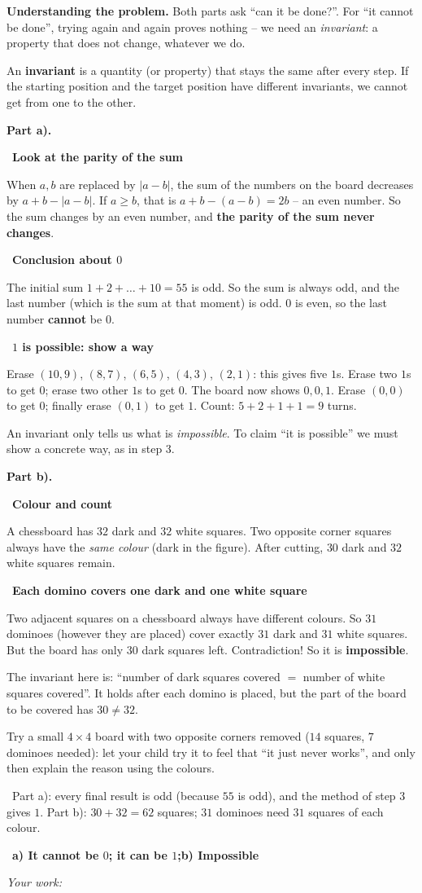 \documentclass[11pt]{article}
\newif\ifsol \solfalse
\providecommand{\AnsWord}{Đáp số}
\newcommand{\StuProb}[2]{\begin{probboxS}{#1}{#2}\StuProbBody\end{probboxS}}
\newcommand{\ans}[1]{\par\smallskip{\bfseries\color{tmGreen!88!black}\AnsWord:}\ {\bfseries\color{AnsRed}#1}\par}
\newcommand{\probsol}[1]{%
  \begin{lrbox}{\solmeasure}\begin{minipage}{\dimexpr\linewidth-24pt\relax}#1\end{minipage}\end{lrbox}%
  \ifsol
    \begin{solbox}#1\end{solbox}%
  \else
    \setlength{\solht}{\dimexpr\ht\solmeasure+\dp\solmeasure+0.85cm\relax}%
    \ifdim\solht<1.35cm\setlength{\solht}{1.35cm}\fi
    \ifdim\solht>\StudentMaxWork\setlength{\solht}{\StudentMaxWork}\fi
    \par\noindent\begin{minipage}{\linewidth}%
    \expandafter\StuProb\StuProbArgs
    \begin{tcolorbox}[colback=white,colframe=Line,boxrule=0.8pt,arc=5pt,
      left=8pt,right=8pt,top=4pt,bottom=4pt,height=\solht]{\footnotesize\color{Slate}\itshape\WorkWord}\end{tcolorbox}%
    \end{minipage}\par\medskip
  \fi}
\newlength{\StudentMaxWork}\setlength{\StudentMaxWork}{4.5cm}
\newcommand{\step}[2]{\par\smallskip\noindent{\bfseries\color{tmBlue!85!black}\StepWord~#1.}\ {\bfseries #2}\par\nopagebreak}
\newcommand{\verify}[1]{\par\smallskip\noindent{\bfseries\color{tmGreen!80!black}\faCheckCircle\ \CheckWord}\ #1\par}
\def\WorkWord{Your work:}
\def\AnsWord{Answer}
\def\StepWord{Step}
\def\CheckWord{Check:}
\begin{document}
\probsol{
\textbf{Understanding the problem.} Both parts ask ``can it be done?''. For ``it cannot be done'', trying again and again proves nothing --
we need an \emph{invariant}: a property that does not change, whatever we do.
\begin{recallbox}An \textbf{invariant} is a quantity (or property) that stays the same after every step. If the starting position and
the target position have different invariants, we cannot get from one to the other.\end{recallbox}
\par\smallskip\textbf{Part a).}
\step{1}{Look at the parity of the sum}
When $a, b$ are replaced by $|a - b|$, the sum of the numbers on the board decreases by $a + b - |a - b|$. If $a \ge b$, that is
$a + b - (a - b) = 2b$ -- an even number. So the sum changes by an even number, and \textbf{the parity of the sum never changes}.
\step{2}{Conclusion about $0$}
The initial sum $1 + 2 + \dots + 10 = 55$ is odd. So the sum is always odd, and the last number (which is the sum at that moment) is
odd. $0$ is even, so the last number \textbf{cannot} be $0$.
\step{3}{$1$ is possible: show a way}
Erase $(10, 9)$, $(8, 7)$, $(6, 5)$, $(4, 3)$, $(2, 1)$: this gives five $1$s. Erase two $1$s to get $0$; erase two other $1$s to get
$0$. The board now shows $0, 0, 1$. Erase $(0, 0)$ to get $0$; finally erase $(0, 1)$ to get $1$. Count: $5 + 2 + 1 + 1 = 9$ turns.
\begin{warnbox}An invariant only tells us what is \emph{impossible}. To claim ``it is possible'' we must show a concrete way, as in step 3.
\end{warnbox}
\par\smallskip\textbf{Part b).}
\step{4}{Colour and count}
A chessboard has $32$ dark and $32$ white squares. Two opposite corner squares always have the \emph{same colour} (dark in the figure).
After cutting, $30$ dark and $32$ white squares remain.
\step{5}{Each domino covers one dark and one white square}
Two adjacent squares on a chessboard always have different colours. So $31$ dominoes (however they are placed) cover exactly $31$ dark
and $31$ white squares. But the board has only $30$ dark squares left. Contradiction! So it is \textbf{impossible}.
\begin{proofbox}The invariant here is: ``number of dark squares covered $=$ number of white squares covered''. It holds after each domino
is placed, but the part of the board to be covered has $30 \ne 32$.\end{proofbox}
\begin{parentbox}Try a small $4\times 4$ board with two opposite corners removed ($14$ squares, $7$ dominoes needed): let your child try
it to feel that ``it just never works'', and only then explain the reason using the colours.\end{parentbox}
\verify{Part a): every final result is odd (because $55$ is odd), and the method of step 3 gives $1$. Part b): $30 + 32 = 62$ squares;
$31$ dominoes need $31$ squares of each colour.}
\ans{a) It cannot be $0$; it can be $1$;\quad b) Impossible}
}
\end{document}
